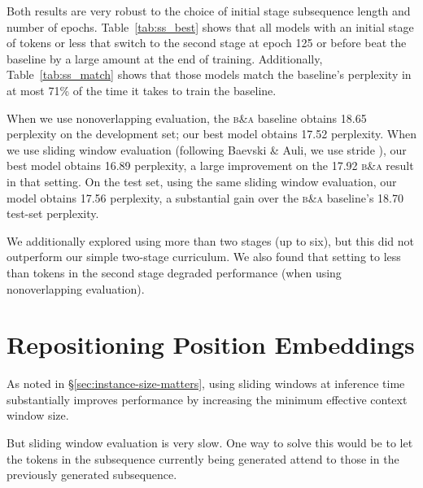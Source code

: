 \documentclass[11pt,a4paper]{article}
\newcommand{\ba}{\textsc{b\&a}\xspace}
\begin{document}
Both results are very robust to the choice of initial stage subsequence length and number of epochs. Table~\ref{tab:ss_best} shows that all models with an initial stage of  tokens or less that switch to the second stage at epoch 125 or before beat the baseline by a large amount at the end of training. Additionally, Table~\ref{tab:ss_match} shows that those models match the baseline's perplexity in at most 71\% of the time it takes to train the baseline. 


When we use nonoverlapping evaluation, the \ba baseline obtains 18.65 perplexity on the development set; our best model obtains 17.52 perplexity.
When we use sliding window evaluation (following Baevski \& Auli, we use stride ), our best model obtains 16.89 perplexity, a large improvement on the 17.92 \ba result  in that setting. On the test set, using the same sliding window evaluation, our model obtains 17.56 perplexity, a substantial gain over the \ba baseline's 18.70 test-set perplexity.

We additionally explored using more than two stages (up to six), but this did not outperform our simple two-stage curriculum.  We also found that setting  to less than  tokens in the second stage degraded performance (when using nonoverlapping evaluation).  

 

 \section{Repositioning Position Embeddings}
\label{sec:pia}


As noted in \S\ref{sec:instance-size-matters}, using sliding windows at inference time substantially improves performance by increasing the minimum effective context window size. 

But sliding window evaluation is very slow. 
One way to solve this would be to let the tokens in the subsequence currently being generated attend to those in the previously generated subsequence. 




\begin{figure*}
\centering

    \quad \quad \quad

\caption{\label{fig:pia-noah-version}
A visualization of the inputs to the self-attention sublayer, conventionally (left)  and with our approach (right), for . The subsequence \emph{the cat sat} is used to predict \emph{on}; next, \emph{cat sat on} is used to predict \emph{the}. } 
\end{figure*}
\end{document}
